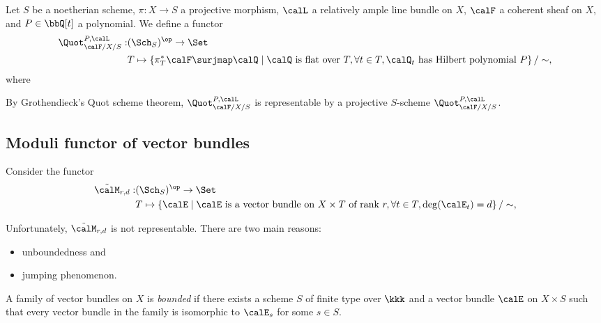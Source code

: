     \begin{example}\label{eg:Quot_scheme}
        Let \(S\) be a noetherian scheme, \(\pi:X \to S\) a projective morphism, \(\calL\) a relatively ample line bundle on \(X\), \(\calF\) a coherent sheaf on \(X\), and \(P \in \bbQ[t]\) a polynomial.
        We define a functor
        \begin{align*}
            \Quot_{\calF/X/S}^{P,\calL} : & (\Sch_S)^{\op} \to \Set \\
            & T \mapsto 
            \left\{ 
                \pi^*_T \calF \surjmap \calQ 
            \;\middle|\;
                \calQ \text{ is flat over } T, \forall t \in T, \calQ_t \text{ has Hilbert polynomial } P
            \right\}/ \sim,
        \end{align*}
        where \Yang{}

        By Grothendieck's Quot scheme theorem, \(\Quot_{\calF/X/S}^{P,\calL}\) is representable by a projective \(S\)-scheme \(\Quot_{\calF/X/S}^{P,\calL}\).
    \end{example}

\subsection{Moduli functor of vector bundles}

    Consider the functor 
    \begin{align*}
        \tilde{\calM}_{r,d} : & (\Sch_S)^{\op} \to \Set \\
        & T \mapsto \left\{ 
            \calE 
        \;\middle|\;
            \calE \text{ is a vector bundle on } X \times T \text{ of rank } r, \forall t \in T, \deg(\calE_t) = d
         \right\}/ \sim,
    \end{align*}

    Unfortunately, \(\tilde{\calM}_{r,d}\) is not representable.
    There are two main reasons:
    \begin{itemize}
        \item unboundedness and 
        \item jumping phenomenon.
    \end{itemize}

    \begin{definition}\label{def:bounded_family}
        A family of vector bundles on \(X\) is \emph{bounded} if there exists a scheme \(S\) of finite type over \(\kkk\) and a vector bundle \(\calE\) on \(X \times S\) such that every vector bundle in the family is isomorphic to \(\calE_s\) for some \(s \in S\).
    \end{definition}

